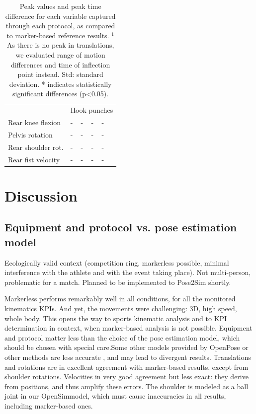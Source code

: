 \begin{table}[!ht]
{\begin{tabular}{llllll}
          \cmidrule(l{2pt}r{2pt}){2-6}
          ~ & \multicolumn{5}{c}{Hook punches} \\
          \cmidrule(l{2pt}r{2pt}){2-6}
          Rear knee flexion & - & - & - & - \\
          Pelvis rotation & - & - & - & - \\
          Rear shoulder rot. & - & - & - & - \\
          Rear fist velocity & - & - & - & - \\
          \bottomrule
      \end{tabular}}
      \caption{Peak values and peak time difference for each variable captured through each protocol, as compared to marker-based reference results. \(^1\) As there is no peak in translations, we evaluated range of motion differences and time of inflection point instead. Std: standard deviation. * indicates statistically significant differences (p<0.05).}
      \label{table:tab_peakboxe}
\end{table}






\FloatBarrier
\section{Discussion}
\subsection{Equipment and protocol vs. pose estimation model}

Ecologically valid context (competition ring, markerless possible, minimal interference with the athlete and with the event taking place). Not multi-person, problematic for a match. Planned to be implemented to Pose2Sim shortly.

Markerless performs remarkably well in all conditions, for all the monitored kinematics KPIs.
And yet, the movements were challenging: 3D, high speed, whole body. This opens the way to sports kinematic analysis and to KPI determination in context, when marker-based analysis is not possible. 
Equipment and protocol matter less than the choice of the pose estimation model, which should be chosen with special care.Some other models provided by OpenPose or other methods are less accurate \cite{Needham2021b}, and may lead to divergent results. 
Translations and rotations are in excellent agreement with marker-based results, except from shoulder rotations. Velocities in very good agreement but less exact: they derive from positions, and thus amplify these errors. The shoulder is modeled as a ball joint in our OpenSimmodel, which must cause inaccuracies in all results, including marker-based ones.

